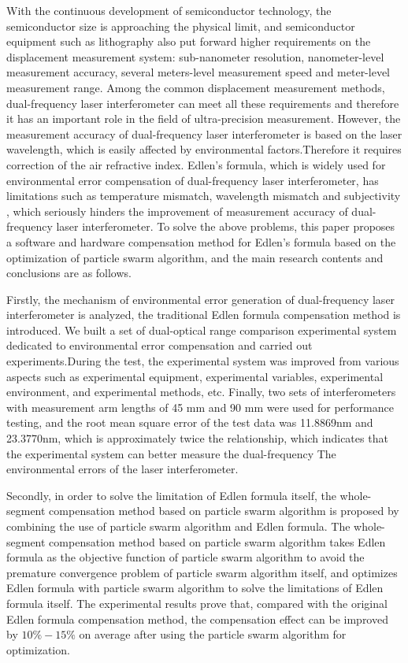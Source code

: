 \begin{abstract*}
  With the continuous development of semiconductor technology, the semiconductor size is approaching the physical limit, and semiconductor equipment such as lithography also put forward higher requirements on the displacement measurement system: sub-nanometer resolution, nanometer-level measurement accuracy, several meters-level measurement speed and meter-level measurement range. Among the common displacement measurement methods, dual-frequency laser interferometer can meet all these requirements and therefore it has an important role in the field of ultra-precision measurement. However, the measurement accuracy of dual-frequency laser interferometer is based on the laser wavelength, which is easily affected by environmental factors.Therefore it requires correction of the air refractive index. Edlen's formula, which is widely used for environmental error compensation of dual-frequency laser interferometer, has limitations such as temperature mismatch, wavelength mismatch and subjectivity , which seriously hinders the improvement of measurement accuracy of dual-frequency laser interferometer. To solve the above problems, this paper proposes a software and hardware compensation method for Edlen's formula based on the optimization of particle swarm algorithm, and the main research contents and conclusions are as follows.

  Firstly, the mechanism of environmental error generation of dual-frequency laser interferometer is analyzed, the traditional Edlen formula compensation method is introduced. We built a set of dual-optical range comparison experimental system dedicated to environmental error compensation and  carried out experiments.During the test, the experimental system was improved from various aspects such as experimental equipment, experimental variables, experimental environment, and experimental methods, etc. Finally, two sets of interferometers with measurement arm lengths of 45 mm and 90 mm were used for performance testing, and the root mean square error of the test data was 11.8869nm and 23.3770nm, which is approximately twice the relationship, which indicates that the experimental system can better measure the dual-frequency The environmental errors of the laser interferometer.

  Secondly, in order to solve the limitation of Edlen formula itself, the whole-segment compensation method based on particle swarm algorithm is proposed by combining the use of particle swarm algorithm and Edlen formula. The whole-segment compensation method based on particle swarm algorithm takes Edlen formula as the objective function of particle swarm algorithm to avoid the premature convergence problem of particle swarm algorithm itself, and optimizes Edlen formula with particle swarm algorithm to solve the limitations of Edlen formula itself. The experimental results prove that, compared with the original Edlen formula compensation method, the compensation effect can be improved by $10\%-15\%$ on average after using the particle swarm algorithm for optimization.


\end{abstract*}
